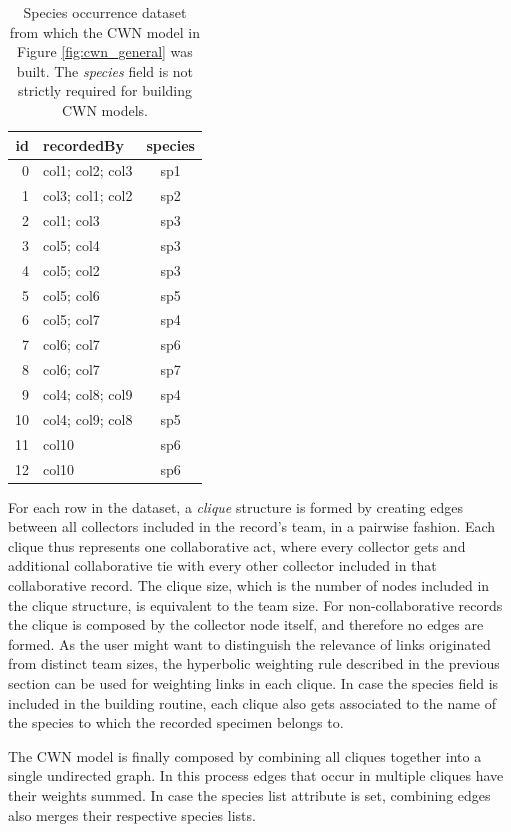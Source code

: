 \begin{table}[!ht]
  \caption{Species occurrence dataset from which the CWN model in Figure \ref{fig:cwn_general} was built. The \textit{species} field is not strictly required for building CWN models.}
  \begin{center}
  \begin{tabular}{r l c}
      id & recordedBy & species \\
      \hline
        0 & col1; col2; col3 & sp1\\ 
        1 & col3; col1; col2 & sp2\\ 
        2 & col1; col3 & sp3\\ 
        3 & col5; col4 & sp3\\ 
        4 & col5; col2 & sp3\\ 
        5 & col5; col6 & sp5\\ 
        6 & col5; col7 & sp4\\ 
        7 & col6; col7 & sp6\\ 
        8 & col6; col7 & sp7\\ 
        9 & col4; col8; col9 & sp4\\ 
        10 & col4; col9; col8 & sp5\\ 
        11 & col10 & sp6\\ 
        12 & col10 & sp6\\
       \hline
  \end{tabular}
  \end{center}
  \label{table:cwn_example_dataset}
\end{table}

For each row in the dataset, a \textit{clique} structure is formed by creating edges between all collectors included in the record's team, in a pairwise fashion. 
Each clique thus represents one collaborative act, where every collector gets and additional collaborative tie with every other collector included in that collaborative record. 
The clique size, which is the number of nodes included in the clique structure, is equivalent to the team size. For non-collaborative records the clique is composed by the collector node itself, and therefore no edges are formed.
As the user might want to distinguish the relevance of links originated from distinct team sizes, the hyperbolic weighting rule described in the previous section can be used for weighting links in each clique. 
In case the species field is included in the building routine, each clique also gets associated to the name of the species to which the recorded specimen belongs to.

The CWN model is finally composed by combining all cliques together into a single undirected graph. In this process edges that occur in multiple cliques have their weights summed. In case the species list attribute is set, combining edges also merges their respective species lists.






